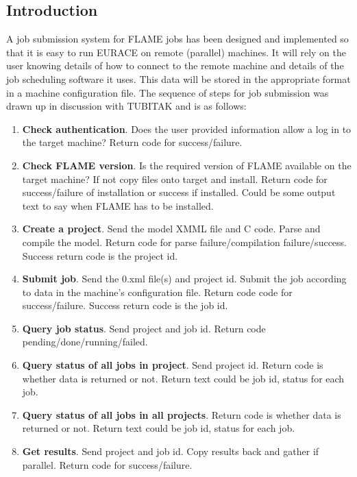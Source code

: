 \subsection{Introduction}

A job submission system for FLAME jobs has been designed and implemented  so that it is easy to run EURACE on remote (parallel) machines. It will rely on the user knowing details of how to connect to the remote machine and details of the job scheduling software it uses. This data will be stored in the appropriate format in a machine configuration file. The sequence of steps for job submission was drawn up in discussion with TUBITAK and is as follows:

\begin{enumerate}
 \item \textbf{Check authentication}. Does the user provided information allow a log in to the target machine? Return code for success/failure.
    \item \textbf{Check FLAME version}. Is the required version of FLAME available on the target machine? If not copy files onto target and install. Return code for success/failure of installation or success if installed. Could be some output text to say when FLAME has to be installed.
    \item \textbf{Create a project}. Send the model XMML file and C code. Parse and compile the model. Return code for parse failure/compilation failure/success. Success return code is the project id.
    \item \textbf{Submit job}. Send the 0.xml file(s) and project id. Submit the job according to data in the machine's configuration file. Return code code for success/failure. Success return code is the job id.
    \item \textbf{Query job status}. Send project and job id. Return code pending/done/running/failed.
    \item \textbf{Query status of all jobs in project}. Send project id. Return code is whether data is returned or not. Return text could be {job id, status} for each job.
    \item \textbf{Query status of all jobs in all projects}. Return code is whether data is returned or not. Return text could be {job id, status} for each job.
    \item \textbf{Get results}. Send project and job id. Copy results back and gather if parallel. Return code for success/failure. 
\end{enumerate}

